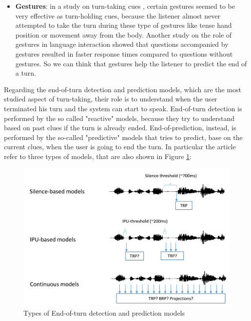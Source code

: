 \documentclass[../main.tex]{subfiles}
\begin{document}
\begin{itemize}
\item \textbf{Gestures}: in a study on turn-taking cues \cite{duncan1972some}, certain gestures seemed to be very effective as turn-holding cues, because the listener almost never attempted to take the turn during these type of gestures like tense hand position or movement away from the body. Another study on the role of gestures in language interaction \cite{holler2018processing} showed that questions accompanied by gestures resulted in faster response times compared to questions without gestures. So we can think that gestures help the listener to predict the end of a turn.

\end{itemize}

Regarding the end-of-turn detection and prediction models, which are the most studied aspect of turn-taking, their role is to understand when the user terminated his turn and the system can start to speak. End-of-turn detection is performed by the so called "reactive" models, because they try to understand based on past clues if the turn is already ended. End-of-prediction, instead, is performed by the so-called "predictive" models that tries to predict, base on the current clues, when the user is going to end the turn. In particular the article refer to three types of models, that are also shown in Figure \ref{fig:models}: 

\begin{figure}[ht]
    \centering
    \includegraphics[width=\textwidth]{images/Turn-taking_models.png}
    \caption{Types of End-of-turn detection and prediction models \cite{skantze2021turn}}
    \label{fig:models}
\end{figure}
\end{document}
